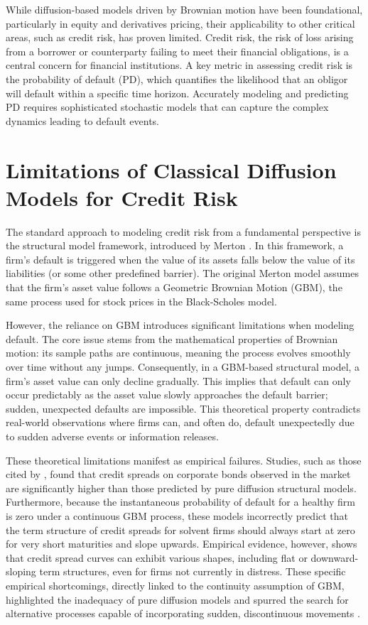 \documentclass[11pt,twoside,openright]{report}
\begin{document}
While diffusion-based models driven by Brownian motion have been foundational, particularly in equity and derivatives pricing, their applicability to other critical areas, such as credit risk, has proven limited. Credit risk, the risk of loss arising from a borrower or counterparty failing to meet their financial obligations, is a central concern for financial institutions. A key metric in assessing credit risk is the probability of default (PD), which quantifies the likelihood that an obligor will default within a specific time horizon. Accurately modeling and predicting PD requires sophisticated stochastic models that can capture the complex dynamics leading to default events.

\section{Limitations of Classical Diffusion Models for Credit Risk}
\label{sec:limitations_diffusion}

The standard approach to modeling credit risk from a fundamental perspective is the structural model framework, introduced by Merton \cite{merton1974pricing}. In this framework, a firm's default is triggered when the value of its assets falls below the value of its liabilities (or some other predefined barrier). The original Merton model assumes that the firm's asset value follows a Geometric Brownian Motion (GBM), the same process used for stock prices in the Black-Scholes model.

However, the reliance on GBM introduces significant limitations when modeling default. The core issue stems from the mathematical properties of Brownian motion: its sample paths are continuous, meaning the process evolves smoothly over time without any jumps. Consequently, in a GBM-based structural model, a firm's asset value can only decline gradually. This implies that default can only occur predictably as the asset value slowly approaches the default barrier; sudden, unexpected defaults are impossible. This theoretical property contradicts real-world observations where firms can, and often do, default unexpectedly due to sudden adverse events or information releases.

These theoretical limitations manifest as empirical failures. Studies, such as those cited by \cite{zhou1997jump}, found that credit spreads on corporate bonds observed in the market are significantly higher than those predicted by pure diffusion structural models. Furthermore, because the instantaneous probability of default for a healthy firm is zero under a continuous GBM process, these models incorrectly predict that the term structure of credit spreads for solvent firms should always start at zero for very short maturities and slope upwards. Empirical evidence, however, shows that credit spread curves can exhibit various shapes, including flat or downward-sloping term structures, even for firms not currently in distress. These specific empirical shortcomings, directly linked to the continuity assumption of GBM, highlighted the inadequacy of pure diffusion models and spurred the search for alternative processes capable of incorporating sudden, discontinuous movements \cite{zhou1997jump}.
\end{document}
